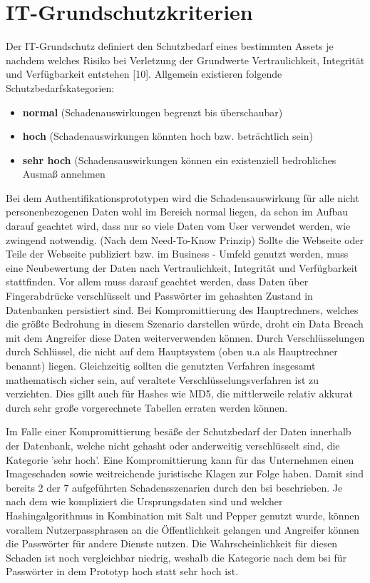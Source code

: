 \section{IT-Grundschutzkriterien}
Der IT-Grundschutz definiert den Schutzbedarf eines bestimmten Assets je nachdem welches Risiko bei Verletzung der Grundwerte Vertraulichkeit, Integrität und Verfügbarkeit entstehen [10]. Allgemein existieren folgende Schutzbedarfskategorien:
\begin{itemize} 
\item \textbf{normal} (Schadenauswirkungen begrenzt bis überschaubar)
\item \textbf{hoch} (Schadenauswirkungen könnten hoch bzw. beträchtlich sein)
\item \textbf{sehr hoch} (Schadensauswirkungen können ein existenziell bedrohliches Ausmaß annehmen
\end{itemize}
Bei dem Authentifikationsprototypen wird die Schadensauswirkung für alle nicht personenbezogenen Daten wohl im Bereich normal liegen, da schon im Aufbau darauf geachtet wird, dass nur so viele Daten vom User verwendet werden, wie zwingend notwendig. (Nach dem Need-To-Know Prinzip) Sollte die Webseite oder Teile der Webseite publiziert bzw. im Business - Umfeld genutzt werden, muss eine Neubewertung der Daten nach Vertraulichkeit, Integrität und Verfügbarkeit stattfinden. Vor allem muss darauf geachtet werden, dass Daten über Fingerabdrücke verschlüsselt und Passwörter im gehashten Zustand in Datenbanken persistiert sind. Bei Kompromittierung des Hauptrechners, welches die größte Bedrohung in diesem Szenario darstellen würde, droht ein Data Breach mit dem Angreifer diese Daten weiterverwenden können. Durch Verschlüsselungen durch Schlüssel, die nicht auf dem Hauptsystem (oben u.a als Hauptrechner benannt) liegen. Gleichzeitig sollten die genutzten Verfahren insgesamt mathematisch sicher sein, auf veraltete Verschlüsselungsverfahren ist zu verzichten. Dies gillt auch für Hashes wie MD5, die mittlerweile relativ akkurat durch sehr große vorgerechnete Tabellen erraten werden können.

Im Falle einer Kompromittierung besäße der Schutzbedarf der Daten innerhalb der Datenbank, welche nicht gehasht oder anderweitig verschlüsselt sind, die Kategorie 'sehr hoch'. Eine Kompromittierung kann für das Unternehmen einen Imageschaden sowie weitreichende juristische Klagen zur Folge haben. Damit sind bereits 2 der 7 aufgeführten Schadensszenarien durch den \ac{bsi} beschrieben. Je nach dem wie kompliziert die Ursprungsdaten sind und welcher Hashingalgorithmus in Kombination mit Salt und Pepper genutzt wurde, können vorallem Nutzerpassphrasen an die Öffentlichkeit gelangen und Angreifer können die Passwörter für andere Dienste nutzen. Die Wahrscheinlichkeit für diesen Schaden ist noch vergleichbar niedrig, weshalb die Kategorie nach dem \ac{bsi} für Passwörter in dem Prototyp hoch statt sehr hoch ist.
\newpage


